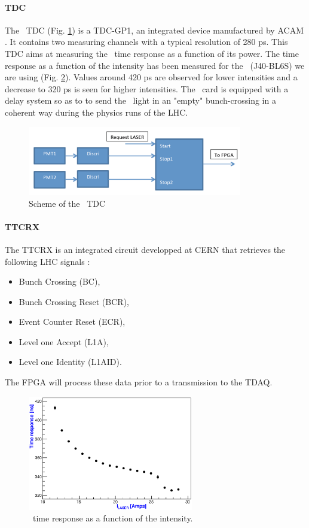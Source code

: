 \paragraph{TDC}
The \lascar~TDC (Fig. \ref{fig:laslascartdc}) is a TDC-GP1, an integrated device manufactured by ACAM \cite{ref:tdc}. It contains two measuring channels with a typical resolution of 280 ps. This TDC aims at measuring the \las~time response as a function of its power. The time response as a function of the intensity has been measured for the \las~(J40-BL6S) we are using (Fig. \ref{fig:lasresponse}). Values around 420 ps are observed for lower intensities and a decrease to 320 ps is seen for higher intensities. The \lascar~card is equipped with a delay system so as to to send the \las~light in an "empty" bunch-crossing in a coherent way during the physics runs of the LHC.

\begin{figure}[htbp]

\centering
\includegraphics[height=3cm]{figures/tdc.pdf}
\caption{Scheme of the \lascar~TDC}\label{fig:laslascartdc}
\end{figure}

\paragraph{TTCRX}

The TTCRX \cite{ref:ttcrx} is an integrated circuit developped at CERN that retrieves the following LHC signals :
\begin{itemize}
\item Bunch Crossing (BC),
\item Bunch Crossing Reset (BCR),
\item Event Counter Reset (ECR),
\item Level one Accept (L1A),
\item Level one Identity (L1AID).
\end{itemize}

The FPGA will process these data prior to  a transmission to the TDAQ.

\begin{figure}[htbp]
\centering
\includegraphics[height=5cm]{figures/laser_timing_new.eps}
\caption{\las~time response as a function of the intensity.}\label{fig:lasresponse}
\end{figure}


